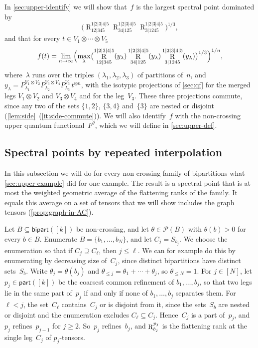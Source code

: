 \documentclass[11pt,letterpaper]{article}
\DeclareMathOperator{\tensorrank}{R}
\newcommand{\parts}{\mathsf{part}}
\newcommand{\bipart}{\mathsf{bipart}}
\begin{document}
In \cref{sec:upper-identify} we will show that~$f$ is the largest spectral point dominated by
\[
\bigl( \tensorrank^{1|2|3|4|5}_{12|345} \tensorrank^{1|2|3|4|5}_{34|125} \tensorrank^{1|2|3|4|5}_{3|1245} \bigr)^{1/3},
\]
and that for every $t \in V_1 \otimes \cdots \otimes V_5$
\[
f(t) = \lim_{n \to \infty} \Bigl( \max_{\lambda} \bigl( \tensorrank^{1|2|3|4|5}_{12|345}(y_\lambda) \tensorrank^{1|2|3|4|5}_{34|125}(y_\lambda) \tensorrank^{1|2|3|4|5}_{3|1245}(y_\lambda) \bigr)^{1/3} \Bigr)^{1/n},
\]
where~$\lambda$ runs over the triples $(\lambda_1, \lambda_2, \lambda_3)$ of partitions of~$n$, and $y_\lambda = P^{V_1 \otimes V_2}_{\lambda_1} P^{V_3 \otimes V_4}_{\lambda_2} P^{V_3}_{\lambda_3}\, t^{\otimes n}$, with the isotypic projections of \cref{sec:qf} for the merged legs $V_1 \otimes V_2$ and $V_3 \otimes V_4$ and for the leg~$V_3$. These three projections commute, since any two of the sets $\{1,2\}$, $\{3,4\}$ and~$\{3\}$ are nested or disjoint (\cref{lem:side}~(\ref{it:side-commute})). We will also identify~$f$ with the non-crossing upper quantum functional~$F^\theta$, which we will define in \cref{sec:upper-def}.

\subsection{Spectral points by repeated interpolation}\label{sec:upper-interp}
In this subsection we will do for every non-crossing family of bipartitions what \cref{sec:upper-example} did for one example. The result is a spectral point that is at most the weighted geometric average of the flattening ranks of the family. It equals this average on a set of tensors that we will show includes the graph tensors (\cref{prop:graph-in-AC}).

Let $B \subseteq \bipart([k])$ be non-crossing, and let $\theta \in \mathcal{P}(B)$ with $\theta(b) > 0$ for every $b \in B$. Enumerate $B = \{b_1, \ldots, b_N\}$, and let $C_j = S_{b_j}$. We choose the enumeration so that if $C_j \supseteq C_\ell$, then $j \leq \ell$. We can for example do this by enumerating by decreasing size of~$C_j$, since distinct bipartitions have distinct sets~$S_b$. Write $\theta_j = \theta(b_j)$ and $\theta_{\leq j} = \theta_1 + \cdots + \theta_j$, so $\theta_{\leq N} = 1$. For $j \in [N]$, let $p_j \in \parts([k])$ be the coarsest common refinement of $b_1, \ldots, b_j$, so that two legs lie in the same part of~$p_j$ if and only if none of $b_1, \ldots, b_j$ separates them. For $\ell < j$, the set~$C_\ell$ contains~$C_j$ or is disjoint from it, since the sets~$S_b$ are nested or disjoint and the enumeration excludes $C_\ell \subseteq C_j$. Hence~$C_j$ is a part of~$p_j$, and~$p_j$ refines~$p_{j-1}$ for $j \geq 2$. So~$p_j$ refines~$b_j$, and $\tensorrank^{p_j}_{\smash[b]{b_j}}$ is the flattening rank at the single leg~$C_j$ of $p_j$-tensors. 
\end{document}
